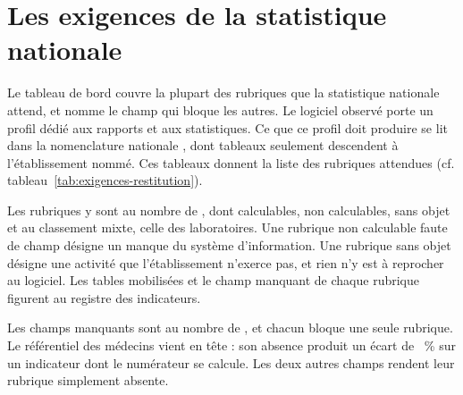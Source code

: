\section{Les exigences de la statistique nationale}

Le tableau de bord couvre la plupart des rubriques que la statistique nationale attend, et nomme le
champ qui bloque les autres. Le logiciel observé porte un profil dédié aux rapports et aux
statistiques. Ce que ce profil doit produire se lit dans la nomenclature
nationale \cite{s30}, dont  tableaux seulement descendent à l'établissement nommé. Ces  tableaux donnent la liste des rubriques attendues (cf. tableau~\ref{tab:exigences-restitution}).

\begin{table}[htbp]
\centering
\caption[Les rubriques attendues par la nomenclature nationale]{Les rubriques que la nomenclature nationale attend d'un établissement nommé, et l'état de chacune}\label{tab:exigences-restitution}
\footnotesize
{}
\end{table}

Les rubriques y sont au nombre de , dont
 calculables,  non calculables,
 sans objet et  au classement
mixte, celle des laboratoires.
Une rubrique non calculable faute de champ désigne un manque du système d'information. Une rubrique
sans objet désigne une activité que l'établissement n'exerce pas, et rien n'y est à reprocher au
logiciel. Les tables mobilisées et le champ manquant de chaque rubrique figurent au registre des
indicateurs.

Les champs manquants sont au nombre de , et chacun bloque une
seule rubrique. Le référentiel des médecins vient en tête : son absence produit un écart de
~\% sur un indicateur dont le numérateur se calcule. Les deux
autres champs rendent leur rubrique simplement absente.

